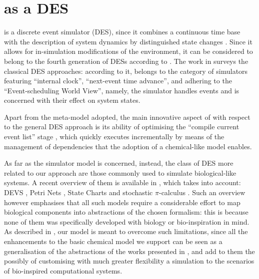 \documentclass[12pt,a4paper,twoside,openright]{book}
\begin{document}
\section{\alchemist{} as a DES}

\alchemist{} is a discrete event simulator (DES), since it combines a continuous time base with the description of system dynamics by distinguished state changes \cite{Zeigler2000}.
%
Since it allows for in-simulation modifications of the environment, it can be considered to belong to the fourth generation of DESs according to \cite{BabulakIJOE2008}.
%
The work in \cite{Pollacia89} surveys the classical DES approaches: according to it, \alchemist{} belongs to the category of simulators featuring ``internal clock'', ``next-event time advance'', and adhering to the ``Event-scheduling World View'', namely, the simulator handles events and is concerned with their effect on system states.

Apart from the meta-model adopted, the main innovative aspect of \alchemist{} with respect to the general DES approach is its ability of optimising the ``compile current event list'' stage \cite{Pollacia89}, which \alchemist{} quickly executes incrementally by means of the management of dependencies that the adoption of a chemical-like model enables.

As far as the simulator model is concerned, instead, the class of DES more related to our approach are those commonly used to simulate biological-like systems.
%
A recent overview of them is available in \cite{EwaldJOS2007}, which takes into account: DEVS \cite{zeigler1984}, Petri Nets \cite{murata1989}, State Charts \cite{Harel1987} and stochastic $\pi$-calculus \cite{Priami1995}.
%
Such an overview however emphasises that all such models require a considerable effort to map biological components into abstractions of the chosen formalism: this is because none of them was specifically developed with biology or bio-inspiration in mind.
%
As described in , our model is meant to overcome such limitations, since all the enhancements to the basic chemical model we support can be seen as a generalisation of the abstractions of the works presented in \cite{EwaldJOS2007}, and add to them the possibly of customising with much greater flexibility a simulation to the scenarios of bio-inspired computational systems.
\end{document}
